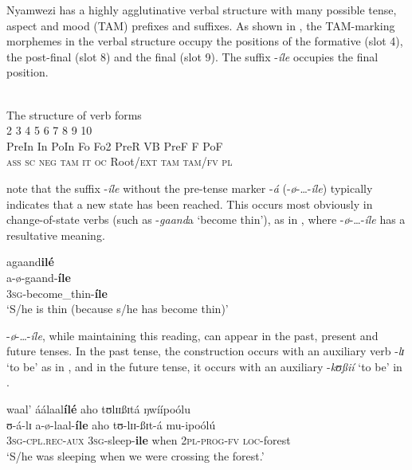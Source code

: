 \documentclass[output=paper]{langscibook}
\begin{document}
Nyamwezi has a highly agglutinative verbal structure with many possible tense, aspect and mood (TAM) prefixes and suffixes. As shown in , the TAM-marking morphemes in the verbal structure occupy the positions of the formative (slot 4), the post-final (slot 8) and the final (slot 9). The suffix -\textit{íle} occupies the final position. 

\ea \label{ex:kanijo:3}
\\
The structure of verb forms\\
  2  3  4  5  6  7  8  9  10\\
PreIn  In    PoIn      Fo     Fo2    PreR    VB     PreF     F        PoF\\
\textsc{ass} \textsc{sc} \textsc{neg}  \textsc{tam} \textsc{it} \textsc{oc}   Root/\textsc{ext} \textsc{tam}  \textsc{tam}/\textsc{fv}  \textsc{pl}\\
\z


\citet{Maganga1992} note that the suffix -\textit{íle} without the pre-tense marker -\textit{á} (-\textit{ø}-…-\textit{íle}) typically indicates that a new state has been reached. This occurs most obviously in change-of-state verbs (such as -\textit{gaand}a ‘become thin’), as in , where -\textit{ø}-…-\textit{íle} has a resultative meaning. 

\ea \label{ex:kanijo:4}
\glll agaand\textbf{ilé}\\
a-ø-gaand-\textbf{íle}\\
3\textsc{sg}-become\_thin-\textbf{íle}\\
\glt ‘S/he is thin (because s/he has become thin)’
\z

-\textit{ø}-\ldots-\textit{íle}, while maintaining this reading, can appear in the past, present and future tenses. In the past tense, the construction occurs with an auxiliary verb -\textit{l}{\textit{ɪ}} ‘to be’ as in , and in the future tense, it occurs with an auxiliary -\textit{kʊßií} ‘to be’ in . 

\ea \label{ex:kanijo:5}
\glll waal’    áálaal\textbf{ílé}   aho   tʊlɪɪßɪtá     ŋwíípoólu\\
ʊ-á-lɪ           a-ø-laal-\textbf{íle}     aho   tʊ-lɪɪ-ßɪt-á      mu-ipoólú\\
\textsc{3sg}-\textsc{cpl}.\textsc{rec}-\textsc{aux} \textsc{3sg}-sleep-\textbf{ile} when \textsc{2pl}-\textsc{prog}-\textsc{fv} \textsc{loc}-forest\\
\glt ‘S/he was sleeping when we were crossing the forest.’
\z
\end{document}
